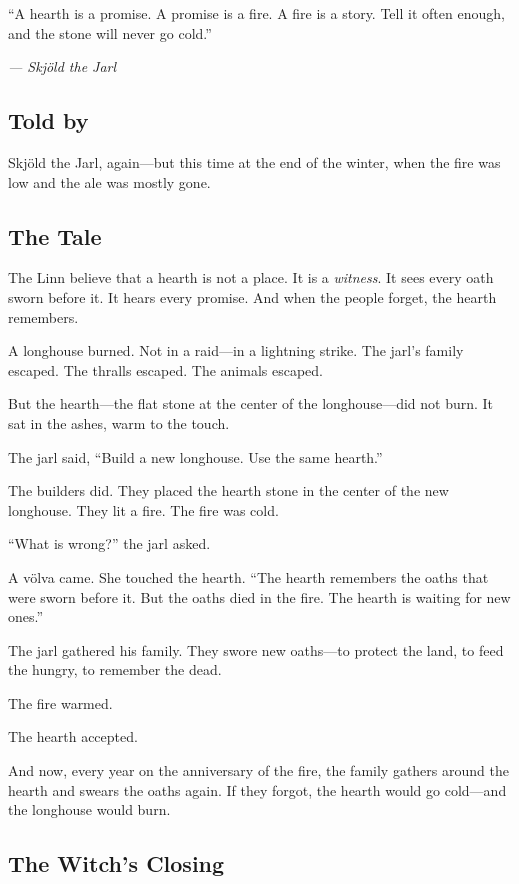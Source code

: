 \documentclass[9pt,a5paper]{extbook}
\begin{document}
\epigraph{``A hearth is a promise. A promise is a fire. A fire is a story. Tell it often enough, and the stone will never go cold.''}{\textit{--- Skjöld the Jarl}}

\subsection*{Told by}

Skjöld the Jarl, again---but this time at the end of the winter, when the fire was low and the ale was mostly gone.

\subsection*{The Tale}

The Linn believe that a hearth is not a place. It is a \textit{witness}. It sees every oath sworn before it. It hears every promise. And when the people forget, the hearth remembers.

A longhouse burned. Not in a raid---in a lightning strike. The jarl's family escaped. The thralls escaped. The animals escaped.

But the hearth---the flat stone at the center of the longhouse---did not burn. It sat in the ashes, warm to the touch.

The jarl said, ``Build a new longhouse. Use the same hearth.''

The builders did. They placed the hearth stone in the center of the new longhouse. They lit a fire. The fire was cold.

``What is wrong?'' the jarl asked.

A völva came. She touched the hearth. ``The hearth remembers the oaths that were sworn before it. But the oaths died in the fire. The hearth is waiting for new ones.''

The jarl gathered his family. They swore new oaths---to protect the land, to feed the hungry, to remember the dead.

The fire warmed.

The hearth accepted.

And now, every year on the anniversary of the fire, the family gathers around the hearth and swears the oaths again. If they forgot, the hearth would go cold---and the longhouse would burn.

\subsection*{The Witch's Closing}
\end{document}

